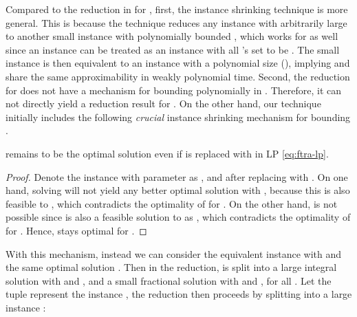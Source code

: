\documentclass[10pt]{llncs}
\begin{document}
Compared to the reduction in \cite{yan2011newresults} for ,
first, the instance shrinking technique is more general. This is because
the technique reduces any  instance with arbitrarily large
 to another small  instance with polynomially bounded
, which works for  as well since an 
instance can be treated as an  instance with all 's
set to be . The small  instance
is then equivalent to an  instance with a polynomial size (),
implying  and  share the same approximability in weakly
polynomial time. Second, the reduction for  does not
have a mechanism for bounding  polynomially in .
Therefore, it can not directly yield a reduction result for .
On the other hand, our technique initially includes the following
\textit{crucial} instance shrinking mechanism for bounding .
\begin{claim}
 remains to
be the optimal solution even if  is replaced with 
in LP \eqref{eq:ftra-lp}. \end{claim}
\begin{proof}
Denote the instance with parameter  as ,
and  after replacing  with .
On one hand, solving  will not yield any better optimal
solution 
with ,
because this 
is also feasible to , which contradicts the optimality
of  for .
On the other hand, 
is not possible since 
is also a feasible solution to  as ,
which contradicts the optimality of 
for . Hence, 
stays optimal for .
\end{proof}
With this mechanism, instead we can consider the equivalent 
instance  with 
and the same optimal solution .
Then in the reduction, 
is split into a large integral solution with 
and ,
and a small fractional solution with 
and , for all .
Let the tuple 
represent the instance , the reduction then proceeds
by splitting  into a large instance :
\end{document}
